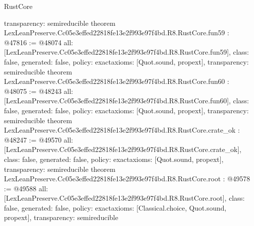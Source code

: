 \begin{lexlean}{RustCore}
\begin{coremodule}
{  transparency: semireducible
}
theorem LexLeanPreserve.Cc05e3effed22818fe13e2f993e97f4bd.R8.RustCore.fun59 : @47816 := @48074 {
  all: [LexLeanPreserve.Cc05e3effed22818fe13e2f993e97f4bd.R8.RustCore.fun59],
  class: false,
  generated: false,
  policy: exact{axioms: [Quot.sound, propext]},
  transparency: semireducible
}
theorem LexLeanPreserve.Cc05e3effed22818fe13e2f993e97f4bd.R8.RustCore.fun60 : @48075 := @48243 {
  all: [LexLeanPreserve.Cc05e3effed22818fe13e2f993e97f4bd.R8.RustCore.fun60],
  class: false,
  generated: false,
  policy: exact{axioms: [Quot.sound, propext]},
  transparency: semireducible
}
theorem LexLeanPreserve.Cc05e3effed22818fe13e2f993e97f4bd.R8.RustCore.crate_ok : @48247 := @49570 {
  all: [LexLeanPreserve.Cc05e3effed22818fe13e2f993e97f4bd.R8.RustCore.crate_ok],
  class: false,
  generated: false,
  policy: exact{axioms: [Quot.sound, propext]},
  transparency: semireducible
}
theorem LexLeanPreserve.Cc05e3effed22818fe13e2f993e97f4bd.R8.RustCore.root : @49578 := @49588 {
  all: [LexLeanPreserve.Cc05e3effed22818fe13e2f993e97f4bd.R8.RustCore.root],
  class: false,
  generated: false,
  policy: exact{axioms: [Classical.choice, Quot.sound, propext]},
  transparency: semireducible
}


\end{coremodule}
\end{lexlean}

